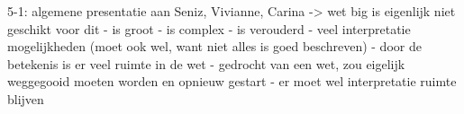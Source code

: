 5-1:
algemene presentatie aan Seniz, Vivianne, Carina
-> wet big is eigenlijk niet geschikt voor dit
- is groot
- is complex
- is verouderd
- veel interpretatie mogelijkheden (moet ook wel, want niet alles is goed beschreven)
- door de betekenis is er veel ruimte in de wet
- gedrocht van een wet, zou eigelijk weggegooid moeten worden en opnieuw gestart
- er moet wel interpretatie ruimte blijven
